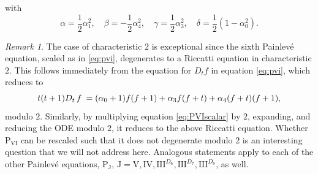 \documentclass[a4paper,reqno]{amsart}
\numberwithin{equation}{section}
\numberwithin{figure}{section}
\theoremstyle{remark}
\newtheorem{remark}[theorem]{Remark}
\newcommand\Psix{\textrm{P}_{\textrm{VI}}}
\begin{document}
with
\begin{equation*}
    \alpha=\frac{1}{2}\alpha_1^2,\quad \beta=-\frac{1}{2}\alpha_4^2,\quad
    \gamma=\frac{1}{2}\alpha_3^2,\quad \delta=\frac{1}{2}(1-\alpha_0^2).
\end{equation*}
\begin{remark}\label{eq:pvichar2}
    The case of characteristic $2$ is exceptional since the sixth Painlev\'e equation, scaled as in \eqref{eq:pvi},
    degenerates to a Riccatti equation in characteristic $2$. This follows immediately from the equation for $D_tf$ in equation \eqref{eq:pvi}, which reduces to 
\begin{equation*}
   t(t+1) D_t \hspace{0.6mm}f\hspace{0.86mm}=(\alpha_0+1)f(f+1)+\alpha_3 f(f+t)+\alpha_4(f+t)(f+1),
\end{equation*}
modulo $2$. Similarly,  by multiplying equation \eqref{eq:PVIscalar} by $2$, expanding, and reducing the ODE modulo $2$, it reduces to the above Riccatti equation. Whether $\Psix$ can be rescaled such that it does not degenerate modulo $2$ is an interesting question that we will not address here. Analogous statements apply to each of the other Painlev\'e equations, $\textrm{P}_{\textrm{J}}$, $\textrm{J}=\textrm{V},\textrm{IV},\textrm{III}^{D_6},\textrm{III}^{D_7},\textrm{III}^{D_8}$, as well.
\end{remark}
\end{document}
